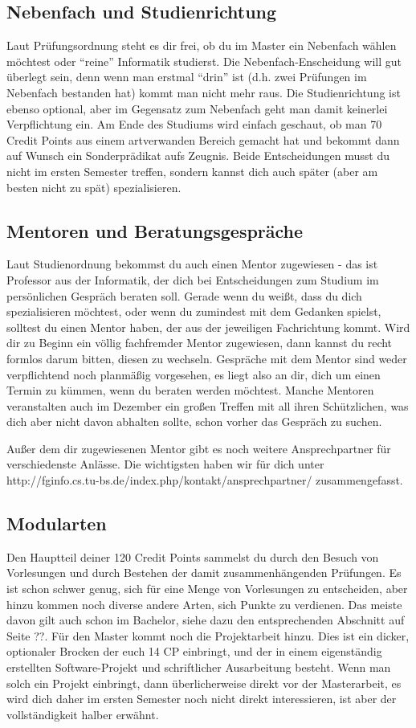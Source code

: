 \subsection{Nebenfach und Studienrichtung}
Laut Prüfungsordnung steht es dir frei, ob du im Master ein Nebenfach wählen möchtest oder "`reine"' Informatik studierst. Die Nebenfach-Enscheidung will gut überlegt sein, denn wenn man erstmal "`drin"' ist (d.h. zwei Prüfungen im Nebenfach bestanden hat) kommt man nicht mehr raus. Die Studienrichtung ist ebenso optional, aber im Gegensatz zum Nebenfach geht man damit keinerlei Verpflichtung ein. Am Ende des Studiums wird einfach geschaut, ob man 70 Credit Points aus einem artverwanden Bereich gemacht hat und bekommt dann auf Wunsch ein Sonderprädikat aufs Zeugnis. Beide Entscheidungen musst du nicht im ersten Semester treffen, sondern kannst dich auch später (aber am besten nicht zu spät) spezialisieren.

\subsection{Mentoren und Beratungsgespräche}
Laut Studienordnung bekommst du auch einen Mentor zugewiesen - das ist Professor aus der Informatik, der dich bei Entscheidungen zum Studium im persönlichen Gespräch beraten soll. Gerade wenn du weißt, dass du dich spezialisieren möchtest, oder wenn du zumindest mit dem Gedanken spielst, solltest du einen Mentor haben, der aus der jeweiligen Fachrichtung kommt. Wird dir zu Beginn ein völlig fachfremder Mentor zugewiesen, dann kannst du recht formlos darum bitten, diesen zu wechseln. Gespräche mit dem Mentor sind weder verpflichtend noch planmäßig vorgesehen, es liegt also an dir, dich um einen Termin zu kümmen, wenn du beraten werden möchtest. Manche Mentoren veranstalten auch im Dezember ein großen Treffen mit all ihren Schützlichen, was dich aber nicht davon abhalten sollte, schon vorher das Gespräch zu suchen.

Außer dem dir zugewiesenen Mentor gibt es noch weitere Ansprechpartner für verschiedenste Anlässe. Die wichtigsten haben wir für dich unter http://fginfo.cs.tu-bs.de/index.php/kontakt/ansprechpartner/ zusammengefasst.

\subsection{Modularten}
Den Hauptteil deiner 120 Credit Points sammelst du durch den Besuch von Vorlesungen und durch Bestehen der damit zusammenhängenden Prüfungen. Es ist schon schwer genug, sich für eine Menge von Vorlesungen zu entscheiden, aber hinzu kommen noch diverse andere Arten, sich Punkte zu verdienen. Das meiste davon gilt auch schon im Bachelor, siehe dazu den entsprechenden Abschnitt auf Seite ??. Für den Master kommt noch die Projektarbeit hinzu. Dies ist ein dicker, optionaler Brocken der euch 14 CP einbringt, und der in einem eigenständig erstellten Software-Projekt und schriftlicher Ausarbeitung besteht. Wenn man solch ein Projekt einbringt, dann überlicherweise direkt vor der Masterarbeit, es wird dich daher im ersten Semester noch nicht direkt interessieren, ist aber der vollständigkeit halber erwähnt.

